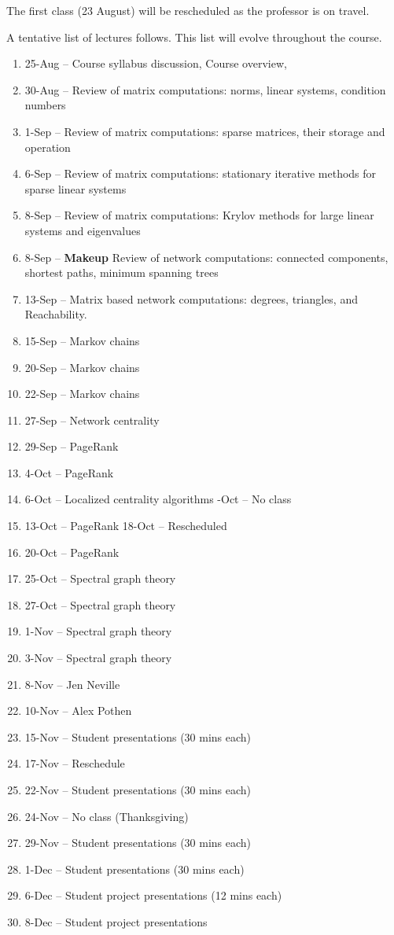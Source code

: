 \documentclass{article}
\begin{document}
The first class (23 August) will be rescheduled as the professor is on travel.

A tentative list of lectures follows. This list will evolve throughout the course.

\begin{enumerate}%
\item 25-Aug --{} Course syllabus discussion, Course overview,
\item 30-Aug --{} Review of matrix computations: norms, linear systems, condition numbers
\item 1-Sep --{} Review of matrix computations: sparse matrices, their storage and operation
\item 6-Sep --{} Review of matrix computations: stationary iterative methods for sparse linear systems
\item 8-Sep --{} Review of matrix computations: Krylov methods for large linear systems and eigenvalues
\item 8-Sep --{} \textbf{Makeup} Review of network computations: connected components, shortest paths, minimum spanning trees
\item 13-Sep --{} Matrix based network computations: degrees, triangles, and Reachability.
\item 15-Sep --{} Markov chains
\item 20-Sep --{} Markov chains
\item 22-Sep --{} Markov chains
\item 27-Sep --{} Network centrality
\item 29-Sep --{} PageRank
\item 4-Oct --{} PageRank
\item 6-Oct --{} Localized centrality algorithms -Oct --{} No class
\item 13-Oct --{} PageRank 18-Oct --{} Rescheduled
\item 20-Oct --{} PageRank
\item 25-Oct --{} Spectral graph theory
\item 27-Oct --{} Spectral graph theory
\item 1-Nov --{} Spectral graph theory
\item 3-Nov --{} Spectral graph theory
\item 8-Nov --{} Jen Neville
\item 10-Nov --{} Alex Pothen
\item 15-Nov --{} Student presentations (30 mins each)
\item 17-Nov --{} Reschedule
\item 22-Nov --{} Student presentations (30 mins each)
\item 24-Nov --{} No class (Thanksgiving)
\item 29-Nov --{} Student presentations (30 mins each)
\item 1-Dec --{} Student presentations (30 mins each)
\item 6-Dec --{} Student project presentations (12 mins each)
\item 8-Dec --{} Student project presentations

\end{enumerate}
\end{document}
